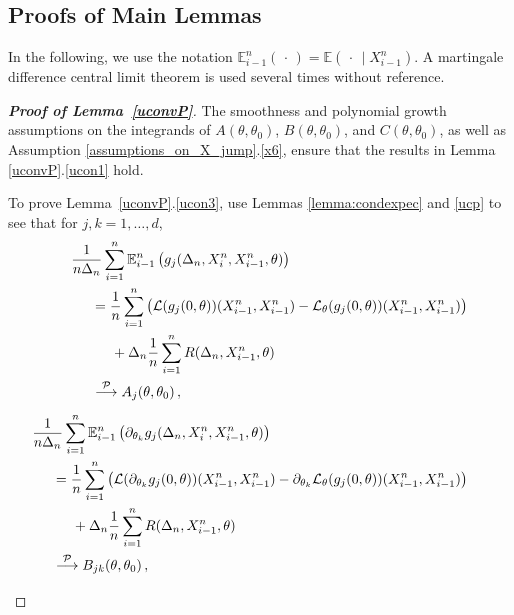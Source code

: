 \documentclass[11pt,a4paper]{article}
\newcommand{\xtl}{{X^n_{i-1}}}
\newcommand{\xtr}{X^n_i}
\newcommand{\thetan}{{\theta_0}}
\newcommand{\thetak}{{\theta_k}}
\newcommand{\EE}{{\mathbb E}}
\renewcommand{\ll}{{\mathcal{L}}}
\newcommand{\pp}{{\mathcal{P}}}
\numberwithin{equation}{section}
\numberwithin{theorem}{section}
\begin{document}
\subsection{Proofs of Main Lemmas}\label{sec:main_lemma_proofs}
%
In the following, we use the notation $\EE^n_{i-1}\left( \,\cdot\, \right) = \EE( \,\cdot\,\mid \xtl)$. A martingale difference central limit theorem \cite[Corollary $3.1$]{hall1980} is used several times without reference. 
%
\begin{proof}[\textbf{Proof of Lemma~\ref{uconvP}}]
The smoothness and polynomial growth assumptions on the integrands of $A(\theta,\thetan)$, $B(\theta,\thetan)$, and $C(\theta,\thetan)$, as well as Assumption \ref{assumptions_on_X_jump}.\ref{x6}, ensure that the results in Lemma  \ref{uconvP}.\ref{ucon1} hold. \medskip

To prove Lemma~\ref{uconvP}.\ref{ucon3}, use Lemmas \ref{lemma:condexpec} and \ref{ucp} to see that for  $j,k =1,\ldots,d$,
\begin{align}
\begin{split} 
&\hspace{-5mm} \frac{1}{n\Delta_n} \sum_{i=1}^n \EE^n_{i-1}\left( g_j(\Delta_n,\xtr,\xtl, \theta)\right)  \\
&= \frac{1}{n} \sum_{i=1}^n \left( \ll( g_j(0, \theta) )(\xtl,\xtl) - \ll_\theta( g_j(0, \theta) )(\xtl, \xtl)\right) \\
&\hspace{5mm} + \Delta_n \frac{1}{n} \sum_{i=1}^n R(\Delta_n, \xtl, \theta)\nonumber\\
&\overset{\pp}{\longrightarrow} A_j(\theta, \thetan)\,,\\
\end{split}\\[0.5em]
\begin{split}
&\hspace{-5mm} \frac{1}{n\Delta_n} \sum_{i=1}^n \EE^n_{i-1}\left( \partial_{\thetak} g_j(\Delta_n,\xtr, \xtl, \theta)\right) \\
&= \frac{1}{n} \sum_{i=1}^n\left( \ll(\partial_{\thetak} g_j(0,\theta))(\xtl,\xtl) - \partial_{\thetak} \ll_\theta(g_j(0, \theta))(\xtl,\xtl)\right) \\
&\hspace{5mm} + \Delta_n\frac{1}{n} \sum_{i=1}^n R(\Delta_n,\xtl, \theta) \\
&\overset{\pp}{\longrightarrow} B_{jk}(\theta, \thetan)\,,\nonumber\\
\end{split}\\[0.5em]

\end{align}
\end{proof}
\end{document}
